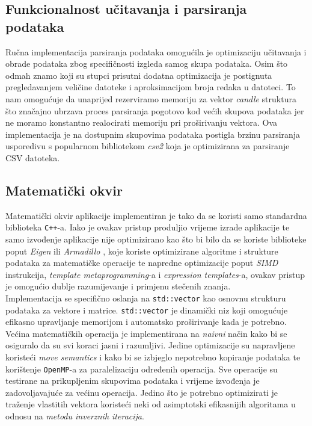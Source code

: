 \documentclass[zavrsnirad, upload]{fer}
\begin{document}
\subsection{Funkcionalnost učitavanja i parsiranja podataka}
Ručna implementacija parsiranja podataka omogućila je
optimizaciju učitavanja i obrade podataka zbog specifičnosti
izgleda samog skupa podataka. Osim što odmah znamo koji su stupci
prisutni dodatna optimizacija je postignuta pregledavanjem veličine
datoteke i aproksimacijom broja redaka u datoteci. To nam omogućuje
da unaprijed rezerviramo memoriju za vektor \emph{candle} struktura
što značajno ubrzava proces parsiranja pogotovo kod većih skupova
podataka jer ne moramo konstantno realocirati memoriju pri proširivanju
vektora. Ova implementacija je na dostupnim skupovima podataka
postigla brzinu parsiranja usporedivu s popularnom bibliotekom
\emph{csv2} \cite{csv2} koja je optimizirana za parsiranje CSV datoteka.

\subsection{Matematički okvir}
\label{sek:matematicki_okvir_rezultati}
Matematički okvir aplikacije implementiran je tako da
se koristi samo standardna biblioteka \texttt{C++}-a. Iako je ovakav pristup
produljio vrijeme izrade aplikacije te samo izvođenje aplikacije
nije optimizirano kao što bi bilo da se koriste biblioteke poput
\emph{Eigen} \cite{Eigen3} ili \emph{Armadillo} \cite{10980539},
koje koriste optimizirane algoritme i strukture podataka za
matematičke operacije te napredne optimizacije poput \emph{SIMD} instrukcija,
\emph{template metaprogramming}-a i \emph{expression templates}-a,
ovakav pristup je omogućio dublje razumijevanje i primjenu
stečenih znanja.\\
Implementacija se specifično oslanja
na \texttt{std::vector} kao osnovnu strukturu podataka za vektore i
matrice. \texttt{std::vector} je dinamički niz koji omogućuje
efikasno upravljanje memorijom i automatsko proširivanje
kada je potrebno.\\
Većina matematičkih operacija je implementirana na \emph{naivni} način
kako bi se osiguralo da su svi koraci jasni i razumljivi. Jedine
optimizacije su napravljene koristeći \emph{move semantics} i
kako bi se izbjeglo nepotrebno kopiranje podataka te korištenje
\texttt{OpenMP}-a \cite{660313} za paralelizaciju određenih operacija.
Sve operacije su testirane na prikupljenim skupovima podataka i
vrijeme izvođenja je zadovoljavajuće za većinu operacija. Jedino
što je potrebno optimizirati je traženje vlastitih vektora koristeći
neki od asimptotski efikasnijih algoritama u odnosu na \emph{metodu
inverznih iteracija}.
\end{document}
